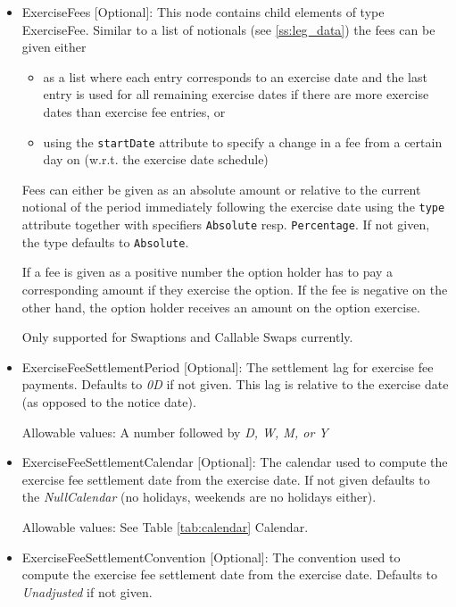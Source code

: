 \begin{itemize}

\item ExerciseFees [Optional]: This node contains child elements of type ExerciseFee. Similar to a list of notionals
  (see \ref{ss:leg_data}) the fees can be given either

  \begin{itemize}
  \item as a list where each entry corresponds to an exercise date and the last entry is used for all remaining exercise
    dates if there are more exercise dates than exercise fee entries, or
  \item using the \verb+startDate+ attribute to specify a change in a fee from a certain day on (w.r.t. the exercise
    date schedule)
  \end{itemize}

  Fees can either be given as an absolute amount or relative to the current notional of the period immediately following
  the exercise date using the \verb+type+ attribute together with specifiers \verb+Absolute+ resp. \verb+Percentage+. If
  not given, the type defaults to \verb+Absolute+.

  If a fee is given as a positive number the option holder has to pay a corresponding amount if they exercise the
  option. If the fee is negative on the other hand, the option holder receives an amount on the option exercise.

  Only supported for Swaptions and Callable Swaps currently.

\item ExerciseFeeSettlementPeriod [Optional]: The settlement lag for exercise fee payments. Defaults to \emph{0D} if not
  given. This lag is relative to the exercise date (as opposed to the notice date).
  
  Allowable values: A number followed by \emph{D, W, M, or Y}

\item ExerciseFeeSettlementCalendar [Optional]: The calendar used to compute the exercise fee settlement date from the
  exercise date. If not given defaults to the  \emph{NullCalendar} (no holidays, weekends are no holidays either).
  
  Allowable values: See Table \ref{tab:calendar} Calendar.

\item ExerciseFeeSettlementConvention [Optional]: The convention used to compute the exercise fee settlement date from
  the exercise date. Defaults to \emph{Unadjusted} if not given.
  

\end{itemize}
